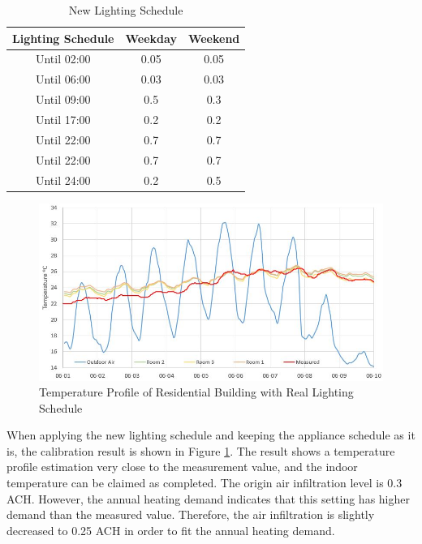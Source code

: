 \documentclass[a4paper, oneside]{discothesis}
\begin{document}
        	\begin{table}[htbp]
        	\centering
        	\caption{New Lighting Schedule}
        	    \begin{tabular}{ccc}
        	    \toprule
        	    Lighting Schedule & Weekday & Weekend\\
        	    \midrule
                Until 02:00 & 0.05 & 0.05 \\
                Until 06:00 & 0.03 & 0.03\\
                Until 09:00 & 0.5 & 0.3\\
                Until 17:00 & 0.2 & 0.2\\
                Until 22:00 & 0.7 & 0.7\\
                Until 22:00 & 0.7 & 0.7\\
                Until 24:00 & 0.2 & 0.5\\
        	    \bottomrule
        	    \end{tabular}%
        	  \label{tab:HonggLightingCtrl}%
        	\end{table}%
			
			
			\begin{figure}[H]
			\centering
			\includegraphics[scale=0.7]{Hongg_Clibration_03NewLight.JPG}
			\caption{Temperature Profile of Residential Building with Real Lighting Schedule}
			\label{fig:HonggerCalibrationNewLight}
			\end{figure}
			
			When applying the new lighting schedule and keeping the appliance schedule as it is, the calibration result is shown in Figure \ref{fig:HonggerCalibrationNewLight}. The result shows a temperature profile estimation very close to the measurement value, and the indoor temperature can be claimed as completed.
			The origin air infiltration level is 0.3 ACH. However, the annual heating demand indicates that this setting has higher demand than the measured value. Therefore, the air infiltration is slightly decreased to 0.25 ACH in order to fit the annual heating demand.\\ 
\end{document}
